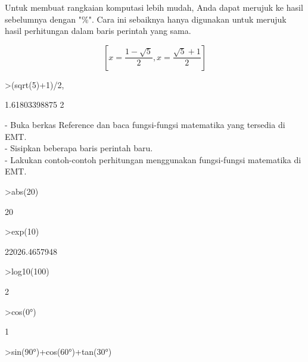 \documentclass{article}
\begin{document}
\begin{eulernotebook}
\begin{eulercomment}
\begin{eulercomment}
\begin{eulercomment}
Untuk membuat rangkaian komputasi lebih mudah, Anda dapat merujuk ke hasil
sebelumnya dengan "\%". Cara ini sebaiknya hanya digunakan untuk merujuk hasil
perhitungan dalam baris perintah yang sama.
\end{eulercomment}
\begin{eulerformula}
\[
\left[ x=\frac{1-\sqrt{5}}{2} , x=\frac{\sqrt{5}+1}{2} \right] 
\]
\end{eulerformula}
\begin{eulerprompt}
>(sqrt(5)+1)/2, %
\end{eulerprompt}
\begin{euleroutput}
  1.61803398875
  2
\end{euleroutput}
\begin{eulercomment}
- Buka berkas Reference dan baca fungsi-fungsi matematika yang
tersedia di EMT.\\
- Sisipkan beberapa baris perintah baru.\\
- Lakukan contoh-contoh perhitungan menggunakan fungsi-fungsi
matematika di EMT.\\
\end{eulercomment}
\eulersubheading{}
\begin{eulerprompt}
>abs(20)
\end{eulerprompt}
\begin{euleroutput}
  20
\end{euleroutput}
\begin{eulerprompt}
>exp(10)
\end{eulerprompt}
\begin{euleroutput}
  22026.4657948
\end{euleroutput}
\begin{eulerprompt}
>log10(100)
\end{eulerprompt}
\begin{euleroutput}
  2
\end{euleroutput}
\begin{eulerprompt}
>cos(0°)
\end{eulerprompt}
\begin{euleroutput}
  1
\end{euleroutput}
\begin{eulerprompt}
>sin(90°)+cos(60°)+tan(30°)
\end{eulerprompt}
\begin{euleroutput}

\end{euleroutput}
\end{eulercomment}
\end{eulercomment}
\end{eulernotebook}
\end{document}

